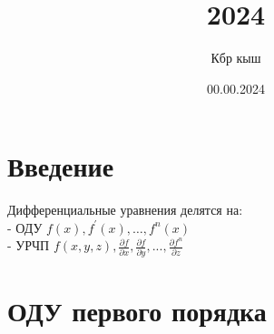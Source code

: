 \documentclass[14pt]{extarticle}
\title{2024}
\author{Кбр кыш}
\date{00.00.2024}
\begin{document}
\maketitle
\tableofcontents

\part*{Введение}

Дифференциальные уравнения делятся на:\\
- ОДУ $f(x), f^{'}(x), \dots, f^{n}(x)$\\
- УРЧП $f(x, y, z), \frac{\partial{f}}{\partial{x}}, 
\frac{\partial{f}}{\partial{y}}, ..., \frac{\partial{f^n}}{\partial{z}}$

\part{ОДУ первого порядка}
\end{document}
